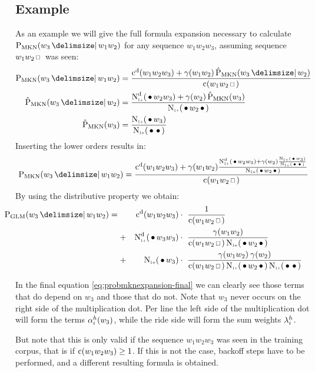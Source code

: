 \subsection{Example}

As an example we will give the full formula expansion necessary to calculate
$\ProbMKN{w_3}{w_1 w_2}$ for any sequence $w_1 w_2 w_3$, assuming sequence
$w_1 w_2 \Skp$ was seen:
\begin{subequations}
  \begin{align}
    \ProbMKN {w_3}{w_1 w_2} &= \ProbMKNcab{\ProbMKN*{w_3}{w_2}} \\
    \ProbMKN*{w_3}{w_2}     &= \ProbMKNcb{\ProbMKN*{w_3}} \\
    \ProbMKN*{w_3}          &= \ProbMKNc
  \end{align}
\end{subequations}
Inserting the lower orders results in:
\begin{equation}
  \ProbMKN {w_3}{w_1 w_2} = \ProbMKNcab{\ProbMKNcb{\ProbMKNc}}
\end{equation}
By using the distributive property we obtain:
\begin{align}
  \label{eq:probmknexpansion-final}
  \hspace{-2.5em}\ProbGLM {w_3}{w_1 w_2} = {}
    & & \DiscountedCount (w_1 w_2 w_3)   & \cdot\ \frac{1}{\Count(w_1 w_2 \Skp)} \\
    &+& \DiscountedCount*(\WSkp w_3 w_3) & \cdot\ \frac{\gamma(w_1 w_2)}{\Count(w_1 w_2 \Skp) \ContCountIp(\WSkp w_2 \WSkp)} \nonumber \\
    &+& \ContCountIp(\WSkp w_3)          & \cdot\ \frac{\gamma(w_1 w_2) \: \gamma(w_2)}{\Count(w_1 w_2 \Skp) \ContCountIp(\WSkp w_2 \WSkp) \ContCountIp(\WSkp \WSkp)} \nonumber
\end{align}

In the final equation \cref{eq:probmknexpansion-final} we can clearly see
those terms that do depend on $w_3$ and those that do not.
Note that $w_3$ never occurs on the right side of the multiplication dot.
Per line the left side of the multiplication dot will form the terms
$\alpha^h_i(w_3)$, while the ride side will form the sum weights
$\lambda^h_i$.

But note that this is only valid if the sequence $w_1 w_2 w_3$ was seen in
the training corpus, that is if $\operatorname{c}(w_1 w_2 w_3) \geq 1$.
If this is not the case, backoff steps have to be performed, and a different
resulting formula is obtained.

